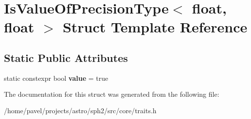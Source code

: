 \hypertarget{structIsValueOfPrecisionType_3_01float_00_01float_01_4}{}\section{Is\+Value\+Of\+Precision\+Type$<$ float, float $>$ Struct Template Reference}
\label{structIsValueOfPrecisionType_3_01float_00_01float_01_4}
\subsection*{Static Public Attributes}
\begin{DoxyCompactItemize}
\item 
\hypertarget{structIsValueOfPrecisionType_3_01float_00_01float_01_4_a457225d78afeb7ab06359e698b7d4cef}{}\label{structIsValueOfPrecisionType_3_01float_00_01float_01_4_a457225d78afeb7ab06359e698b7d4cef} 
static constexpr bool {\bfseries value} = true
\end{DoxyCompactItemize}


The documentation for this struct was generated from the following file\+:\begin{DoxyCompactItemize}
\item 
/home/pavel/projects/astro/sph2/src/core/traits.\+h\end{DoxyCompactItemize}
